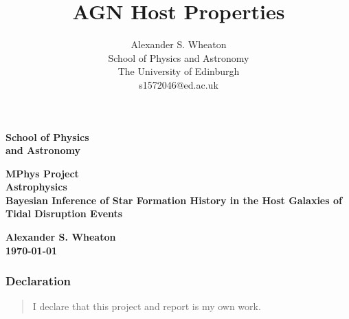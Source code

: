 \documentclass[a4paper,11pt]{article}
\title{AGN Host Properties}
\author{
    Alexander S. Wheaton\\
    School of Physics and Astronomy\\
    The University of Edinburgh\\
    s1572046@ed.ac.uk\break
}
\begin{document}
\thispagestyle{empty}                   %
\epsfxsize=40mm                         %
\begin{minipage}[b]{110mm}
    {\Huge\bf School of Physics\\ and Astronomy
    \vspace*{17mm}}
\end{minipage}
\hfill
\begin{minipage}[t]{40mm}
\end{minipage}
\par\noindent                                           %
\vspace*{2cm}
\begin{center}
    \Large\bf \Large\bf MPhys Project\\
    \Large\bf Astrophysics\\[10pt]                     %
    \LARGE\bf Bayesian Inference of Star Formation History in the Host Galaxies of Tidal Disruption Events
\end{center}
\vspace*{0.5cm}
\begin{center}
    \bf Alexander S. Wheaton\\
    \today
\end{center}
\vspace*{5mm}

\begin{abstract}
    \lipsum[1]
\end{abstract}

\vspace*{1cm}

\subsubsection*{Declaration}
\begin{quotation}
    I declare that this project and report is my own work.
\end{quotation}
\end{document}
